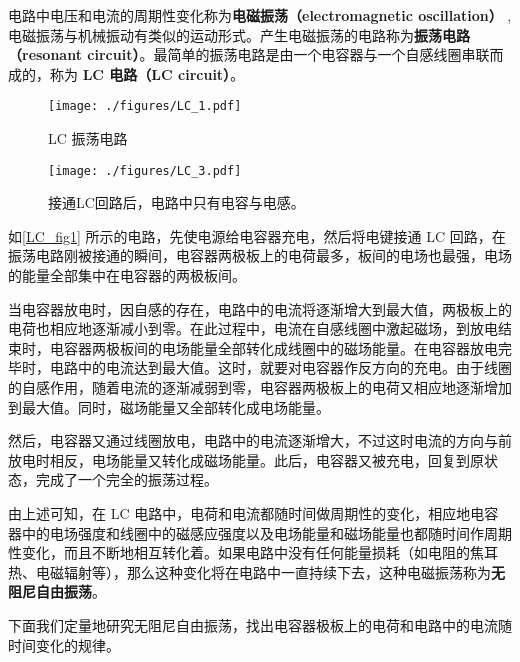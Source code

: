 

电路中电压和电流的周期性变化称为\textbf{电磁振荡（electromagnetic oscillation）} , 电磁振荡与机械振动有类似的运动形式。产生电磁振荡的电路称为\textbf{振荡电路（resonant circuit）}。最简单的振荡电路是由一个电容器与一个自感线圈串联而成的，称为\textbf{ LC 电路（LC circuit）}。
\begin{figure}[ht]
\centering
\texttt{[image: ./figures/LC\_1.pdf]}
\caption{LC 振荡电路} \label{LC_fig1}
\end{figure}
\begin{figure}[ht]
\centering
\texttt{[image: ./figures/LC\_3.pdf]}
\caption{接通LC回路后，电路中只有电容与电感。} \label{LC_fig3}
\end{figure}
如\autoref{LC_fig1} 所示的电路，先使电源给电容器充电，然后将电键接通 LC 回路，在振荡电路刚被接通的瞬间，电容器两极板上的电荷最多，板间的电场也最强，电场的能量全部集中在电容器的两极板间。

当电容器放电时，因自感的存在，电路中的电流将逐渐增大到最大值，两极板上的电荷也相应地逐渐减小到零。在此过程中，电流在自感线圈中激起磁场，到放电结束时，电容器两极板间的电场能量全部转化成线圈中的磁场能量。在电容器放电完毕时，电路中的电流达到最大值。这时，就要对电容器作反方向的充电。由于线圈的自感作用，随着电流的逐渐减弱到零，电容器两极板上的电荷又相应地逐渐增加到最大值。同时，磁场能量又全部转化成电场能量。

然后，电容器又通过线圈放电，电路中的电流逐渐增大，不过这时电流的方向与前放电时相反，电场能量又转化成磁场能量。此后，电容器又被充电，回复到原状态，完成了一个完全的振荡过程。

由上述可知，在 LC 电路中，电荷和电流都随时间做周期性的变化，相应地电容器中的电场强度和线圈中的磁感应强度以及电场能量和磁场能量也都随时间作周期性变化，而且不断地相互转化着。如果电路中没有任何能量损耗（如电阻的焦耳热、电磁辐射等），那么这种变化将在电路中一直持续下去，这种电磁振荡称为\textbf{无阻尼自由振荡}。

下面我们定量地研究无阻尼自由振荡，找出电容器极板上的电荷和电路中的电流随时间变化的规律。

